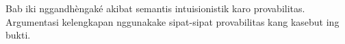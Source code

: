 \documentclass[../../../include/open-logic-chapter]{subfiles}
\begin{document}

\begin{editorial}
Bab iki nggandhèngaké akibat semantis intuisionistik karo provabilitas. Argumentasi kelengkapan nggunakake sipat-sipat provabilitas kang kasebut ing bukti.
\end{editorial}


\OLEndChapterHook
\end{document}
